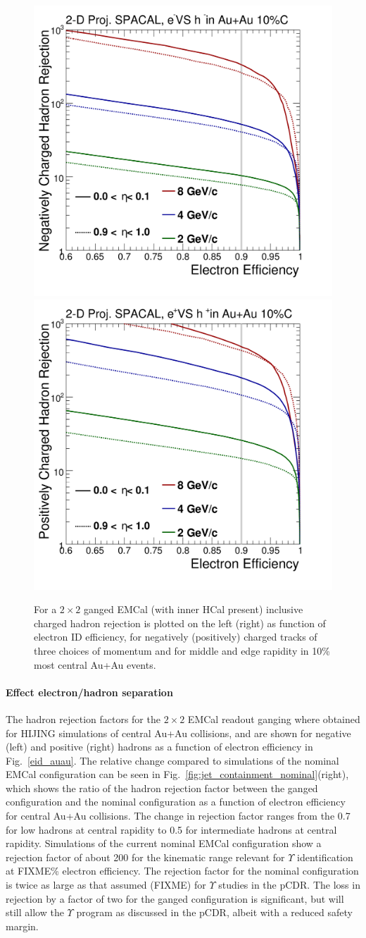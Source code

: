 \begin{figure}[hbt]
  \centering
  \includegraphics[width=0.4\linewidth]{figs/DrawEcal_Likelihood_Sum_RejectionCurve_AuAuSummary}
  \hspace{0.1\linewidth}
  \includegraphics[width=0.4\linewidth]{figs/DrawEcal_Likelihood_Sum_RejectionCurve_AuAuSummaryPos}
  \caption{For a $2\times2$ ganged EMCal (with inner HCal present)
    inclusive charged hadron rejection is plotted on the left (right)
    as function of electron ID efficiency, for negatively (positively)
    charged tracks of three choices of momentum and for middle and
    edge rapidity in 10\% most central Au+Au events.}
  \label{fig:eid_auau}
\end{figure}

\paragraph{Effect electron/hadron separation}

The hadron rejection factors  for the $2\times 2$ EMCal readout ganging where obtained for HIJING simulations of central Au+Au collisions, and are
shown for negative (left) and positive (right) hadrons as a function of electron efficiency in Fig.~\ref{eid_auau}. 
The relative change compared to simulations of the nominal EMCal configuration can be seen in Fig.~\ref{fig:jet_containment_nominal}(right), which shows
the ratio of the hadron rejection factor between the ganged configuration and the nominal configuration as a function
of electron efficiency for central Au+Au collisions. The change in rejection factor ranges from the 0.7 for low \pt hadrons
at central rapidity to 0.5 for intermediate \pt hadrons at central rapidity. Simulations of the current nominal EMCal 
configuration show a rejection factor of about 200 for the kinematic range relevant for $\Upsilon$ identification at FIXME\%
electron efficiency. The rejection factor for the nominal configuration is twice as large as that assumed (FIXME) 
for $\Upsilon$ studies in the pCDR. The loss in rejection by a factor of two for the ganged configuration is significant, but
will still allow the $\Upsilon$ program as discussed in the pCDR, albeit with a reduced safety margin.


